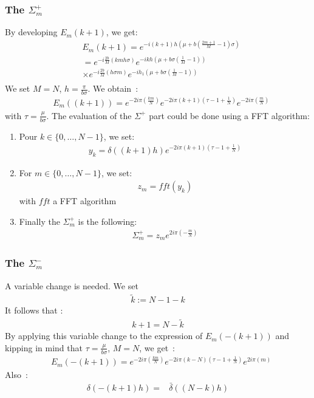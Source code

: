 \subsubsection{The $\Sigma_{m}^{+}$}
By developing $E_m(k+1)$, we get:
\begin{align*}
&E_{m}(k+1)=e^{-i(k+1)h\left(\mu+b\left(\frac{2m+1}{M}-1\right)\sigma\right)}\\
&=e^{-i\frac{2b}{M}\left(kmh\sigma\right)}e^{-ik h\left(\mu+b\sigma\left(\frac{1}{M}-1\right)\right)}\\
&\times e^{-i\frac{2b}{M}\left(h\sigma m\right)}e^{-ih_1\left(\mu+b\sigma\left(\frac{1}{M}-1\right)\right)}\\
\end{align*}
We set $M=N$, $h=\frac{\pi}{b\sigma}$. We obtain~:
\begin{align*}
&E_{m}((k+1))=e^{-2i\pi\left(\frac{k m}{N}\right)}e^{-2i\pi (k+1)\left(\tau-1+\frac{1}{N}\right)}e^{-2i\pi\left(\frac{m}{N}\right)}
\end{align*}
with $\tau=\frac{\mu}{b\sigma}$. The evaluation of the $\Sigma^{+}$ part could be done using a FFT algorithm:
\begin{enumerate}
\item Pour $k\in\{0,\hdots,N-1\}$, we set:
\begin{align}
y_{k}=\delta((k+1)h)e^{-2i\pi (k+1)\left(\tau-1+\frac{1}{N}\right)}
\end{align}
\item For $m \in\{0,\hdots,N-1\}$, we set:
\begin{align}
  z_{m}=fft(y_{k})
\end{align}
with $fft$ a FFT algorithm
\item Finally the $\Sigma_{m}^{+}$ is the following:
\begin{align*}
  \Sigma_{m}^{+}=z_{m}e^{2i\pi\left(-\frac{m}{N}\right)}
\end{align*}
\end{enumerate}

\subsubsection{The $\Sigma_{m}^{-}$}
A variable change is needed. We set
\begin{align*}
\tilde{k}:=N-1-k
\end{align*}
It follows that :
\begin{align*}
k+1 = N - \tilde{k}
\end{align*}
By applying this variable change to the expression of $E_m(-(k+1))$ and kipping in mind that $\tau=\frac{\mu}{b\sigma}$, $M=N$, we get~:
\begin{align*}
&E_{m}(-(k+1))=e^{-2i\pi\left(\frac{k m}{N}\right)}e^{-2i\pi (k-N)\left(\tau-1+\frac{1}{N}\right)}e^{2i\pi\left(m\right)}
\end{align*}
Also~:
\begin{align*}
\delta\left(-(k+1)h\right)=&\bar{\delta}\left((N-k)h\right)\\
\end{align*}

